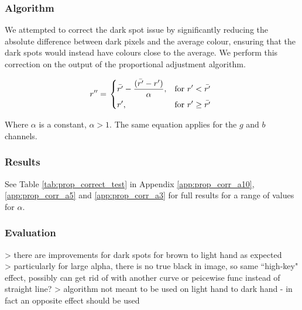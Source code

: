 \subsubsection*{Algorithm}
We attempted to correct the dark spot issue by significantly reducing the absolute difference between dark pixels and the average colour, ensuring that the dark spots would instead have colours close to the average. We perform this correction on the output of the proportional adjustment algorithm.

\begin{equation} \label{eq:prop_corr_algo}
  r'' = \left.
  \begin{dcases}
    \displaystyle \bar{r'} - \frac{(\bar{r'} - r')}{\alpha}, & \text{for } r' < \bar{r'} \\
    \displaystyle r', & \text{for } r' \geq \bar{r'} \\
  \end{dcases}
  \right.\\
\end{equation}


Where $\alpha$ is a constant, $\alpha  > 1$. The same equation applies for the $g$ and $b$ channels.

\subsubsection*{Results}
See Table \ref{tab:prop_correct_test} in Appendix \ref{app:prop_corr_a10}, \ref{app:prop_corr_a5} and \ref{app:prop_corr_a3} for full results for a range of values for $\alpha$. %

\subsubsection*{Evaluation}
> there are improvements for dark spots for brown to light hand as expected\\
> particularly for large alpha, there is no true black in image, so same ``high-key" effect, possibly can get rid of with another curve or peicewise func instead of straight line?
> algorithm not meant to be used on light hand to dark hand - in fact an opposite effect should be used